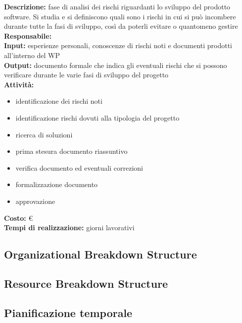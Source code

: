 \textbf{Descrizione:} fase di analisi dei rischi riguardanti lo sviluppo del prodotto software. Si
studia e si definiscono quali sono i rischi in cui si può incombere durante tutte la fasi di
sviluppo, così da poterli evitare o quantomeno gestire\\
\linebreak
\textbf{Responsabile:} \\
\linebreak
\textbf{Input:} esperienze personali, conoscenze di rischi noti e documenti prodotti all’interno
del WP\\
\linebreak
\textbf{Output:} documento formale che indica gli eventuali rischi che si possono verificare
durante le varie fasi di sviluppo del progetto\\
\linebreak
\textbf{Attività:}
\begin{itemize}
\item identificazione dei rischi noti
\item identificazione rischi dovuti alla tipologia del progetto
\item ricerca di soluzioni
\item prima stesura documento riassuntivo
\item verifica documento ed eventuali correzioni
\item formalizzazione documento
\item approvazione
\end{itemize}
\textbf{Costo:} \euro \\
\textbf{Tempi di realizzazione:}  giorni lavorativi


\subsection{Organizational Breakdown Structure}


\subsection{Resource Breakdown Structure}


\subsection{Pianificazione temporale}

